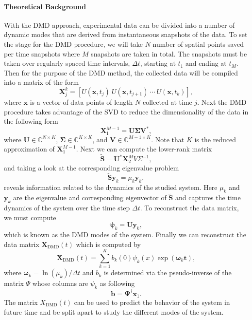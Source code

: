\documentclass[12pt]{article}%
\newcommand{\C}{\mathbb{C}}
\begin{document}
\paragraph{Theoretical Background}

With the DMD approach, experimental data can be divided into a number of dynamic modes that are derived from instantaneous snapshots of the data. To set the stage for the DMD procedure, we will take $N$ number of spatial points saved per time snapshots where $M$ snapshots are taken in total. The snapshots must be taken over regularly spaced time intervals, $\Delta t$, starting at $t_1$ and ending at $t_M$. Then for the purpose of the DMD method, the collected data will be compiled into a matrix of the form
\begin{equation}
    \mathbf{X}_j^k = [U(\mathbf{x},t_{j}) ~ U(\mathbf{x},t_{j+1}) ~ \cdots ~U(\mathbf{x},t_k)],
\end{equation}
where $\mathbf{x}$ is a vector of data points of length $N$ collected at time $j$. Next the DMD procedure takes advantage of the SVD to reduce the dimensionality of the data in the following form
\begin{equation}
    \mathbf{X}_1^{M-1} = \mathbf{U}\mathbf{\Sigma} \mathbf{V}^*,
\end{equation}
where $\mathbf{U} \in \C^{N \times K}$, $\mathbf{\Sigma} \in \C^{K \times K}$, and $\mathbf{V} \in \C^{M - 1 \times K}$. Note that $K$ is the reduced approximation of $\mathbf{X}_1^{M-1}$. Next we can compute the lower-rank matrix
\begin{equation}
    \tilde{\mathbf{S}} = \mathbf{U}^*\mathbf{X}_2^M V \Sigma^{-1},
\end{equation}
and taking a look at the corresponding eigenvalue problem
\begin{equation}
    \tilde{\mathbf{S}} \mathbf{y}_k = \mu_k \mathbf{y}_k,
\end{equation}
reveals information related to the dynamics of the studied system. Here $\mu_k$ and $\mathbf{y}_k$ are the eigenvalue and corresponding eigenvector of $\tilde{\mathbf{S}}$ and captures the time dynamics of the system over the time step $\Delta t$. To reconstruct the data matrix, we must compute
\begin{equation}
    \mathbf{\psi}_k = \mathbf{U}\mathbf{y}_k,
\end{equation} 
which is known as the DMD modes of the system. Finally we can reconstruct the data matrix $\mathbf{X}_\text{DMD}(t)$ which is computed by
\begin{equation}
    \mathbf{X}_\text{DMD}(t) = \sum_{k=1}^K b_k(0) \psi_k(x) \exp(\mathbf{\omega}_k \mathbf{t}),
\end{equation} 
where $\mathbf{\omega}_k = \ln(\mu_k)/ \Delta t$ and $b_k$ is determined via the pseudo-inverse of the matrix $\Psi$ whose columns are $\psi_k$ as following 
\begin{equation}
    \mathbf{b} = \mathbf{\Psi}^{\dagger}\mathbf{x}_1.
\end{equation}
The matrix $X_\text{DMD}(t)$ can be used to predict the behavior of the system in future time and be split apart to study the different modes of the system.
\end{document}

